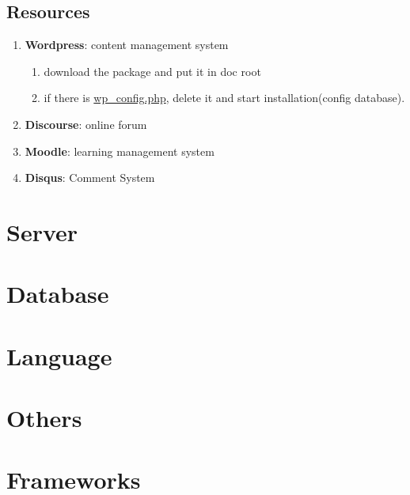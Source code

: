 \documentclass[12pt, a4paper]{report}
\begin{document}
\section{Resources}
    \begin{enumerate}
        \item \textbf{Wordpress}: content management system
            \begin{enumerate}
                \item download the package and put it in doc root
                \item if there is \underline{wp\_config.php}, delete it and start installation(config database).
            \end{enumerate}
        \item \textbf{Discourse}: online forum
        \item \textbf{Moodle}: learning management system 
        \item \textbf{Disqus}: Comment System
    \end{enumerate}



\chapter{Server}






\chapter{Database}




\chapter{Language}





\chapter{Others}




\chapter{Frameworks}


\end{document}
